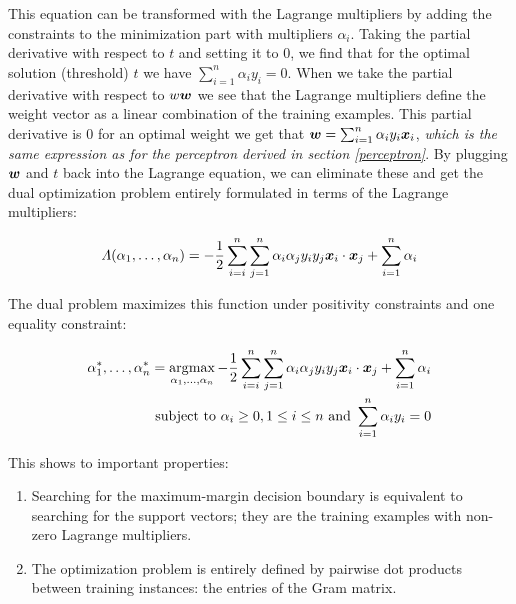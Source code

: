 This equation can be transformed with the Lagrange multipliers by adding the constraints to the minimization part with multipliers $\alpha_i$.
Taking the partial derivative with respect to $t$ and setting it to $0$, we find that for the optimal solution (threshold) $t$ we have $\sum_{i=1}^{n} \alpha_i y_i = 0$.
When we take the partial derivative with respect to $w\vectorsym{w}$ we see that the Lagrange multipliers define the weight vector as a linear combination of the training examples.
This partial derivative is $0$ for an optimal weight we get that $\vectorsym{w} = \sum_{i=1}^{n} \alpha_i y_i \vectorsym{x}_i$, \emph{which is the same expression as for the perceptron derived in section \ref{perceptron}}.
By plugging $\vectorsym{w}$ and $t$ back into the Lagrange equation, we can eliminate these and get the dual optimization problem entirely formulated in terms of the Lagrange multipliers:

\begin{equation}
  \Lambda(\alpha_1, \dots, \alpha_n) = - \frac{1}{2} \sum\limits_{i=i}^n \sum\limits_{j=1}^n \alpha_i \alpha_j y_i y_j \vectorsym{x}_i \cdot \vectorsym{x}_j + \sum\limits_{i=1}^n \alpha_i
\end{equation}

The dual problem maximizes this function under positivity constraints and one equality constraint:

\begin{equation}
\begin{aligned}
  \alpha_1^*, \dots, \alpha_n^* = \argmax\limits_{\alpha_1, \dots, \alpha_n} - \frac{1}{2} \sum\limits_{i=i}^n \sum\limits_{j=1}^n \alpha_i \alpha_j y_i y_j \vectorsym{x}_i \cdot \vectorsym{x}_j + \sum\limits_{i=1}^n \alpha_i \\
  \text{subject to } \alpha_i \geq 0, 1 \leq i \leq n \text{ and } \sum\limits_{i=1}^n \alpha_i y_i = 0
\end{aligned}
\end{equation}

This shows to important properties:
\begin{enumerate}
  \item Searching for the maximum-margin decision boundary is equivalent to searching for the support vectors; they are the training examples with non-zero Lagrange multipliers.
  \item The optimization problem is entirely defined by pairwise dot products between training instances: the entries of the Gram matrix.
\end{enumerate}

